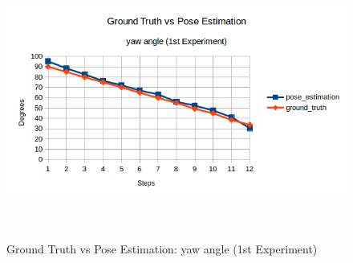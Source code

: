 \begin{figure}[!h]
\begin{center}
\includegraphics[width=5in, height=3.5in]{figures05/1_yaw_validation.png}
\caption{Ground Truth vs Pose Estimation: yaw angle (1st Experiment)}
\label{fig:erroryaw_1nd}
\end{center}
\end{figure}

